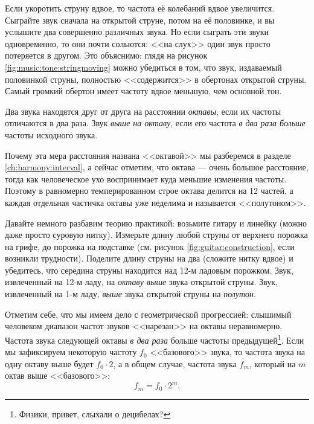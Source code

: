 Если укоротить струну вдвое, то частота её колебаний вдвое увеличится. Сыграйте звук сначала на открытой струне, потом на её половинке, и вы услышите два совершенно различных звука. Но если сыграть эти звуки одновременно, то они почти сольются: <<на слух>> один звук просто потеряется в другом. Это объяснимо: глядя на рисунок \ref{fig:music:tone:stringmoving} можно убедиться в том, что звук, издаваемый половинкой струны, полностью <<содержится>> в обертонах открытой струны. Самый громкий обертон имеет частоту вдвое меньшую, чем основной тон.

\begin{Definition}[Октава]
    Два звука находятся друг от друга на расстоянии \emph{октавы}, если их частоты отличаются в два раза. Звук \emph{выше на октаву}, если его частота \emph{в два раза больше} частоты исходного звука. 
\end{Definition}

Почему эта мера расстояния названа <<октавой>> мы разберемся в разделе \ref{ch:harmony:interval}, а сейчас отметим, что октава --- очень большое расстояние, тогда как человеческое ухо воспринимает куда меньшие изменения частоты. Поэтому в равномерно темперированном строе октава делится на 12 частей, а каждая отдельная частичка октавы уже неделима и называется <<полутоном>>.

\begin{Example}
    Давайте немного разбавим теорию практикой: возьмите гитару и линейку (можно даже просто суровую нитку). Измерьте длину любой струны от верхнего порожка на грифе, до порожка на подставке (см. рисунок \ref{fig:guitar:construction}, если возникли трудности). Поделите длину струны на два (сложите нитку вдвое) и убедитесь, что середина струны находится над 12-м ладовым порожком. Звук, извлеченный на 12-м ладу, на \emph{октаву выше} звука открытой струны. Звук, извлеченный на 1-м ладу, \emph{выше} звука открытой струны на \emph{полутон}.
\end{Example}

Отметим себе, что мы имеем дело с геометрической прогрессией: слышимый человеком диапазон частот звуков <<нарезан>> на октавы неравномерно. Частота звука следующей октавы \emph{в два раза} больше частоты предыдущей\footnote{Физики, привет, слыхали о децибелах?}. Если мы зафиксируем некоторую частоту $f_0$ <<базового>> звука, то частота звука на одну октаву выше будет $f_0\cdot 2$, а в общем случае, частота звука $f_m$, который на $m$ октав выше <<базового>>:
\[
    f_m = f_0\cdot 2^m.
\]

